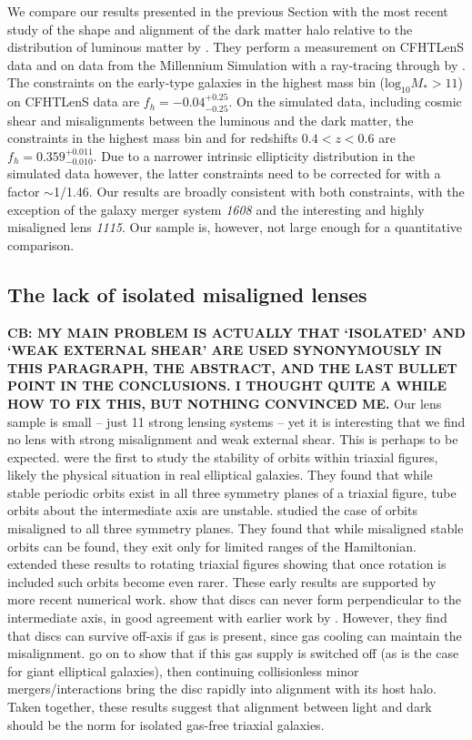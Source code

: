 \documentclass[useAMS,usenatbib]{mn2e}
\begin{document}
We compare our results presented in the previous Section with the most recent study of the shape and alignment of the dark matter halo relative to the distribution of luminous matter by \citet{2015arXiv150704301S}. They perform a measurement on CFHTLenS data and on data from the Millennium Simulation \citep{2005Natur.435..629S} with a ray-tracing through by \citet{2009A&A...499...31H}. The constraints on the early-type galaxies in the highest mass bin ($\mathrm{log_{10}}M_{*}>11$) on CFHTLenS data are $f_{h}=-0.04^{+0.25}_{-0.25}$. On the simulated data, including cosmic shear and misalignments between the luminous and the dark matter, the constraints in the highest mass bin and for redshifts $0.4<z<0.6$ are $f_{h} = 0.359^{+0.011}_{-0.010}$. Due to a narrower intrinsic ellipticity distribution in the simulated data however, the latter constraints need to be corrected for with a factor $\sim$1/1.46. Our results are broadly consistent with both constraints, with the exception of the galaxy merger system \textit{1608} and the interesting and highly misaligned lens \textit{1115}. Our sample is, however, not large enough for a quantitative comparison.

\subsection{The lack of isolated misaligned lenses}
\textbf{CB: MY MAIN PROBLEM IS ACTUALLY THAT `ISOLATED' AND `WEAK EXTERNAL SHEAR' ARE USED SYNONYMOUSLY IN THIS PARAGRAPH, THE ABSTRACT, AND THE LAST BULLET POINT IN THE CONCLUSIONS. I THOUGHT QUITE A WHILE HOW TO FIX THIS, BUT NOTHING CONVINCED ME.}
Our lens sample is small -- just 11 strong lensing systems -- yet it is interesting that we find no lens with strong misalignment and weak external shear. This is perhaps to be expected. \citet{1979ApJ...233..872H} were the first to study the stability of orbits within triaxial figures, likely the physical situation in real elliptical galaxies. They found that while stable periodic orbits exist in all three symmetry planes of a triaxial figure, tube orbits about the intermediate axis are unstable. \citet{1985MNRAS.215..731D} studied the case of orbits misaligned to all three symmetry planes. They found that while misaligned stable orbits can be found, they exit only for limited ranges of the Hamiltonian. \citet{1988A&A...206..269M} extended these results to rotating triaxial figures showing that once rotation is included such orbits become even rarer. These early results are supported by more recent numerical work. \citet{2013MNRAS.434.2971D} show that discs can never form perpendicular to the intermediate axis, in good agreement with earlier work by \citet{1979ApJ...233..872H}. However, they find that discs can survive off-axis if gas is present, since gas cooling can maintain the misalignment. \citet{2015MNRAS.452.4094D} go on to show that if this gas supply is switched off (as is the case for giant elliptical galaxies), then continuing collisionless minor mergers/interactions bring the disc rapidly into alignment with its host halo. Taken together, these results suggest that alignment between light and dark should be the norm for isolated gas-free triaxial galaxies.
\end{document}
